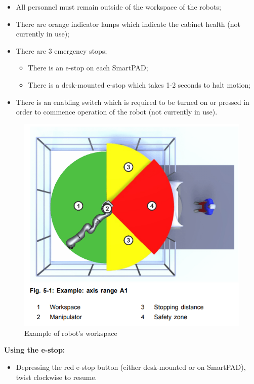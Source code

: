 \documentclass[12pt, letterpaper]{article}
\begin{document}
\begin{itemize}
    \item All personnel must remain outside of the workspace of the robots;
    \item There are orange indicator lamps which indicate the cabinet health (not currently in use);
    \item There are 3 emergency stops;
    \begin{itemize}
        \item There is an e-stop on each SmartPAD;
        \item There is a desk-mounted e-stop which takes 1-2 seconds to halt motion;
    \end{itemize}
    \item There is an enabling switch which is required to be turned on or pressed in order to commence operation of the robot (not currently in use).
\end{itemize} 

\begin{figure}[!h]
    \centering
    \includegraphics{Images/KUKAWorkspace.png}
    \caption{Example of robot's workspace \cite{}}
    \label{fig:robot-workspace}
\end{figure}

\textbf{Using the e-stop:}
\begin{itemize}
    \item Depressing the red e-stop button (either desk-mounted or on SmartPAD), twist clockwise to resume.
\end{itemize}
     
\end{document}
